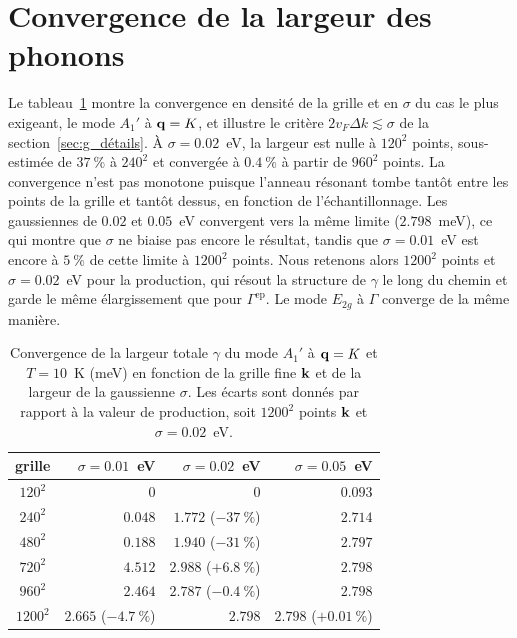 \vspace*{\fill}

\section{Convergence de la largeur des phonons}\label{sec:annexe_conv_gamma_ph}

Le tableau~\ref{tab:gamma_ph_conv} montre la convergence en densité de la grille et en $\sigma$ du cas le plus exigeant, le mode $A_1'$ à $\mathbf{q}=K$, et illustre le critère $2v_F\Delta k\lesssim\sigma$ de la section~\ref{sec:g_détails}. À $\sigma=0.02$~eV, la largeur est nulle à $120^2$ points, sous-estimée de $37~\%$ à $240^2$ et convergée à $0.4~\%$ à partir de $960^2$ points. La convergence n'est pas monotone puisque l'anneau résonant tombe tantôt entre les points de la grille et tantôt dessus, en fonction de l'échantillonnage. Les gaussiennes de $0.02$ et $0.05$~eV convergent vers la même limite ($2.798$~meV), ce qui montre que $\sigma$ ne biaise pas encore le résultat, tandis que $\sigma=0.01$~eV est encore à $5~\%$ de cette limite à $1200^2$ points. Nous retenons alors $1200^2$ points et $\sigma=0.02$~eV pour la production, qui résout la structure de $\gamma$ le long du chemin et garde le même élargissement que pour $\Gamma^\text{ep}$. Le mode $E_{2g}$ à $\Gamma$ converge de la même manière.
\vspace*{\fill}
\begin{table}[htbp]
    \centering
    \caption[Convergence de la largeur du mode $A_1'$ au point $K$.]{Convergence de la largeur totale $\gamma$ du mode $A_1'$ à $\mathbf{q}=K$ et $T=10$~K (meV) en fonction de la grille fine $\mathbf{k}$ et de la largeur de la gaussienne $\sigma$. Les écarts sont donnés par rapport à la valeur de production, soit $1200^2$ points $\mathbf{k}$ et $\sigma=0.02$~eV.}
    \label{tab:gamma_ph_conv}
    \begin{tabular}{crrr}
        \hline\hline
        grille & $\sigma=0.01$~eV & $\sigma=0.02$~eV & $\sigma=0.05$~eV \\
        \hline
        $120^2$  & $0$ & $0$ & $0.093$ \\
        $240^2$  & $0.048$ & $1.772$ ($-37~\%$) & $2.714$ \\
        $480^2$  & $0.188$ & $1.940$ ($-31~\%$) & $2.797$ \\
        $720^2$  & $4.512$ & $2.988$ ($+6.8~\%$) & $2.798$ \\
        $960^2$  & $2.464$ & $2.787$ ($-0.4~\%$) & $2.798$ \\
        $1200^2$ & $2.665$ ($-4.7~\%$) & $2.798$ & $2.798$ ($+0.01~\%$) \\
        \hline\hline
    \end{tabular}
\end{table}
\vspace*{\fill}

